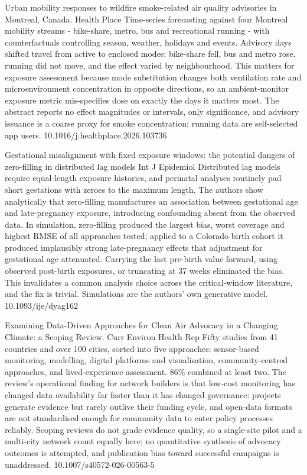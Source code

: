\documentclass[10pt]{article}
\begin{document}
{Urban mobility responses to wildfire smoke-related air quality advisories in Montreal, Canada.}
{Health Place}
{Time-series forecasting against four Montreal mobility streams - bike-share, metro, bus and recreational running - with counterfactuals controlling season, weather, holidays and events. Advisory days shifted travel from active to enclosed modes: bike-share fell, bus and metro rose, running did not move, and the effect varied by neighbourhood. This matters for exposure assessment because mode substitution changes both ventilation rate and microenvironment concentration in opposite directions, so an ambient-monitor exposure metric mis-specifies dose on exactly the days it matters most. The abstract reports no effect magnitudes or intervals, only significance, and advisory issuance is a coarse proxy for smoke concentration; running data are self-selected app users.}
{10.1016/j.healthplace.2026.103736}

{Gestational misalignment with fixed exposure windows: the potential dangers of zero-filling in distributed lag models}
{Int J Epidemiol}
{Distributed lag models require equal-length exposure histories, and perinatal analyses routinely pad short gestations with zeroes to the maximum length. The authors show analytically that zero-filling manufactures an association between gestational age and late-pregnancy exposure, introducing confounding absent from the observed data. In simulation, zero-filling produced the largest bias, worst coverage and highest RMSE of all approaches tested; applied to a Colorado birth cohort it produced implausibly strong late-pregnancy effects that adjustment for gestational age attenuated. Carrying the last pre-birth value forward, using observed post-birth exposures, or truncating at 37 weeks eliminated the bias. This invalidates a common analysis choice across the critical-window literature, and the fix is trivial. Simulations are the authors' own generative model.}
{10.1093/ije/dyag162}


{Examining Data-Driven Approaches for Clean Air Advocacy in a Changing Climate: a Scoping Review.}
{Curr Environ Health Rep}
{Fifty studies from 41 countries and over 100 cities, sorted into five approaches: sensor-based monitoring, modelling, digital platforms and visualisation, community-centred approaches, and lived-experience assessment. 86\% combined at least two. The review's operational finding for network builders is that low-cost monitoring has changed data availability far faster than it has changed governance: projects generate evidence but rarely outlive their funding cycle, and open-data formats are not standardised enough for community data to enter policy processes reliably. Scoping reviews do not grade evidence quality, so a single-site pilot and a multi-city network count equally here; no quantitative synthesis of advocacy outcomes is attempted, and publication bias toward successful campaigns is unaddressed.}
{10.1007/s40572-026-00563-5}
\end{document}
